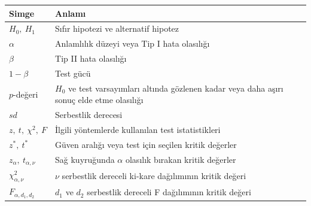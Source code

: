\par\smallskip
\begin{center}
\begin{tabular}{@{}>{\RaggedRight\arraybackslash}p{}>{\RaggedRight\arraybackslash}p{}@{}}
\toprule
\textbf{Simge} & \textbf{Anlamı} \\
\midrule
$H_0,\ H_1$ & Sıfır hipotezi ve alternatif hipotez \\
$\alpha$ & Anlamlılık düzeyi veya Tip I hata olasılığı \\
$\beta$ & Tip II hata olasılığı \\
$1-\beta$ & Test gücü \\
$p$-değeri & $H_0$ ve test varsayımları altında gözlenen kadar veya daha aşırı sonuç elde etme olasılığı \\
$sd$ & Serbestlik derecesi \\
$z,\ t,\ \chi^2,\ F$ & İlgili yöntemlerde kullanılan test istatistikleri \\
$z^*,\ t^*$ & Güven aralığı veya test için seçilen kritik değerler \\
$z_\alpha,\ t_{\alpha,\nu}$ & Sağ kuyruğunda $\alpha$ olasılık bırakan kritik değerler \\
$\chi^2_{\alpha,\nu}$ & $\nu$ serbestlik dereceli ki-kare dağılımının kritik değeri \\
$F_{\alpha,d_1,d_2}$ & $d_1$ ve $d_2$ serbestlik dereceli F dağılımının kritik değeri \\
\bottomrule
\end{tabular}
\end{center}

